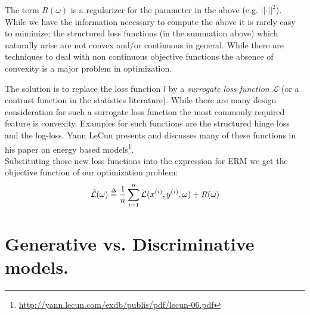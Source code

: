 The term $R(\omega)$ is a regularizer for the parameter in the above (e.g.
$\vert \vert \cdot \vert \vert ^2$). While we have the information necessary to
compute the above it is rarely easy to miminize; the structured loss functions
(in the summation above) which naturally arise are not convex and/or continuous
in general. While there are techniques to deal with non continuous objective
functions the absence of convexity is a major problem in optimization. 

The solution is to replace the loss function $l$ by a \emph{surrogate loss
function} $\mathcal{L}$ (or a contrast function in the statistics literature).  While there
are many design consideration for such a surrogate loss function the most
commonly required feature is convexity. Examples for such functions
are the structured hinge loss and the log-loss. Yann LeCun 
presents and discusses many of these functions in his paper on energy based
models\footnote{\url{http://yann.lecun.com/exdb/publis/pdf/lecun-06.pdf}}.\\

Substituting those new loss functions into the expression for ERM we 
get the objective function of our optimization problem:
\begin{equation}
    \hat{\mathcal L}(\omega) \mathrel{\stackrel{\Delta}{=}} \frac{1}{n}\sum_{i=1}^n
    \mathcal L (x^{(i)},y^{(i)},\omega)
    + R(\omega) \label{eq:surrogate}
\end{equation}

\section{Generative vs. Discriminative models.}

